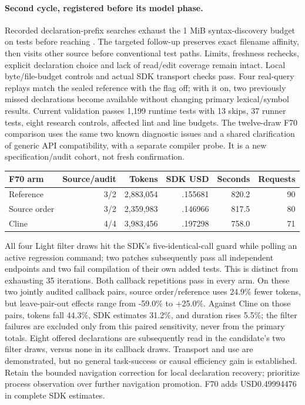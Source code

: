 \documentclass[11pt,a4paper]{article}
\newcommand{\code}[1]{\texttt{\detokenize{#1}}}
\begin{document}
\paragraph{Second cycle, registered before its model phase.}
Recorded declaration-prefix searches exhaust the 1 MiB syntax-discovery budget
on tests before reaching \code{types.ts}. The targeted follow-up preserves exact
filename affinity, then visits other source before conventional test paths.
Limits, freshness rechecks, explicit declaration choice and lack of read/edit
coverage remain intact. Local byte/file-budget controls and actual SDK transport
checks pass. Four real-query replays match the sealed reference with the flag off;
with it on, two previously missed declarations become available without changing
primary lexical/symbol results. Current validation passes 1,199 runtime tests with
13 skips, 37 runner tests, eight research controls, affected lint and line budgets.
The twelve-draw F70 comparison uses the same two
known diagnostic issues and a shared clarification of generic API compatibility,
with a separate compiler probe. It is a new specification/audit cohort, not fresh
confirmation.
\begin{center}\small
\begin{tabular}{lrrrrr}\toprule
F70 arm & Source/audit & Tokens & SDK USD & Seconds & Requests \\\midrule
Reference & 3/2 & 2,883,054 & .155681 & 820.2 & 90 \\
Source order & 3/2 & 2,359,983 & .146966 & 817.5 & 80 \\
Cline & 4/4 & 3,983,456 & .197298 & 758.0 & 71 \\\bottomrule
\end{tabular}\end{center}
All four Light filter draws hit the SDK's five-identical-call guard while polling
an active regression command; two patches subsequently pass all independent
endpoints and two fail compilation of their own added tests. This is distinct
from exhausting 35 iterations. Both callback repetitions pass in every arm.
On these two jointly audited callback pairs, source order/reference uses 24.9\%
fewer tokens, but leave-pair-out effects range from -59.0\% to +25.0\%.
Against Cline on those pairs, tokens fall 44.3\%, SDK estimates 31.2\%, and
duration rises 5.5\%; the filter failures are excluded only from this paired
sensitivity, never from the primary totals. Eight offered declarations are
subsequently read in the candidate's two filter draws, versus none in its callback
draws. Transport and use are demonstrated, but no general task-success or
causal efficiency gain is established. Retain the bounded navigation correction
for local declaration recovery; prioritize process observation over further
navigation promotion. F70 adds USD0.49994476 in complete SDK estimates.
\end{document}
